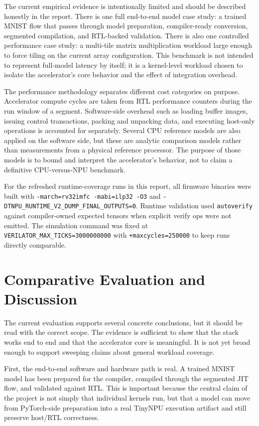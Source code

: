 \documentclass[a4paper, 12pt, titlepage]{article}
\begin{document}
The current empirical evidence is intentionally limited and should be described honestly in the report. There is one full end-to-end model case study: a trained MNIST flow that passes through model preparation, compiler-ready conversion, segmented compilation, and RTL-backed validation. There is also one controlled performance case study: a multi-tile matrix multiplication workload large enough to force tiling on the current array configuration. This benchmark is not intended to represent full-model latency by itself; it is a kernel-level workload chosen to isolate the accelerator’s core behavior and the effect of integration overhead.

The performance methodology separates different cost categories on purpose. Accelerator compute cycles are taken from RTL performance counters during the run window of a segment. Software-side overhead such as loading buffer images, issuing control transactions, packing and unpacking data, and executing host-only operations is accounted for separately. Several CPU reference models are also applied on the software side, but these are analytic comparison models rather than measurements from a physical reference processor. The purpose of those models is to bound and interpret the accelerator’s behavior, not to claim a definitive CPU-versus-NPU benchmark.

For the refreshed runtime-coverage runs in this report, all firmware binaries were built with \texttt{-march=rv32imfc -mabi=ilp32 -O3} and \texttt{-DTNPU\_RUNTIME\_V2\_DUMP\_FINAL\_OUTPUTS=0}. Runtime validation used \texttt{autoverify} against compiler-owned expected tensors when explicit verify ops were not emitted. The simulation command was fixed at \texttt{VERILATOR\_MAX\_TICKS=3000000000} with \texttt{+maxcycles=250000} to keep runs directly comparable.

\newpage
\section{Comparative Evaluation and Discussion}
The current evaluation supports several concrete conclusions, but it should be read with the correct scope. The evidence is sufficient to show that the stack works end to end and that the accelerator core is meaningful. It is not yet broad enough to support sweeping claims about general workload coverage.

First, the end-to-end software and hardware path is real. A trained MNIST model has been prepared for the compiler, compiled through the segmented JIT flow, and validated against RTL. This is important because the central claim of the project is not simply that individual kernels run, but that a model can move from PyTorch-side preparation into a real TinyNPU execution artifact and still preserve host/RTL correctness.
\end{document}
